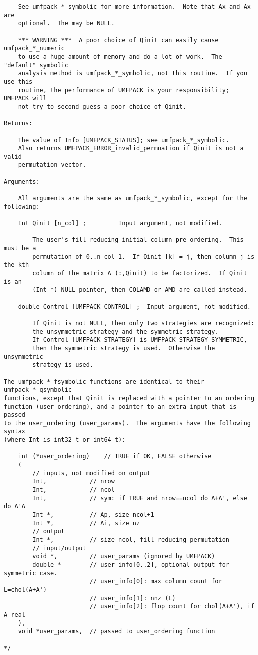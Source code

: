 \documentclass[11pt]{article}
\begin{document}
{\begin{verbatim}
    See umfpack_*_symbolic for more information.  Note that Ax and Ax are
    optional.  The may be NULL.

    *** WARNING ***  A poor choice of Qinit can easily cause umfpack_*_numeric
    to use a huge amount of memory and do a lot of work.  The "default" symbolic
    analysis method is umfpack_*_symbolic, not this routine.  If you use this
    routine, the performance of UMFPACK is your responsibility;  UMFPACK will
    not try to second-guess a poor choice of Qinit.

Returns:

    The value of Info [UMFPACK_STATUS]; see umfpack_*_symbolic.
    Also returns UMFPACK_ERROR_invalid_permuation if Qinit is not a valid
    permutation vector.

Arguments:

    All arguments are the same as umfpack_*_symbolic, except for the following:

    Int Qinit [n_col] ;         Input argument, not modified.

        The user's fill-reducing initial column pre-ordering.  This must be a
        permutation of 0..n_col-1.  If Qinit [k] = j, then column j is the kth
        column of the matrix A (:,Qinit) to be factorized.  If Qinit is an
        (Int *) NULL pointer, then COLAMD or AMD are called instead.

    double Control [UMFPACK_CONTROL] ;  Input argument, not modified.

        If Qinit is not NULL, then only two strategies are recognized:
        the unsymmetric strategy and the symmetric strategy.
        If Control [UMFPACK_STRATEGY] is UMFPACK_STRATEGY_SYMMETRIC,
        then the symmetric strategy is used.  Otherwise the unsymmetric
        strategy is used.

The umfpack_*_fsymbolic functions are identical to their umfpack_*_qsymbolic
functions, except that Qinit is replaced with a pointer to an ordering
function (user_ordering), and a pointer to an extra input that is passed
to the user_ordering (user_params).  The arguments have the following syntax
(where Int is int32_t or int64_t):

    int (*user_ordering)    // TRUE if OK, FALSE otherwise
    (
        // inputs, not modified on output
        Int,            // nrow
        Int,            // ncol
        Int,            // sym: if TRUE and nrow==ncol do A+A', else do A'A
        Int *,          // Ap, size ncol+1
        Int *,          // Ai, size nz
        // output
        Int *,          // size ncol, fill-reducing permutation
        // input/output
        void *,         // user_params (ignored by UMFPACK)
        double *        // user_info[0..2], optional output for symmetric case.
                        // user_info[0]: max column count for L=chol(A+A')
                        // user_info[1]: nnz (L)
                        // user_info[2]: flop count for chol(A+A'), if A real
    ),
    void *user_params,  // passed to user_ordering function

*/

\end{verbatim}
}
\end{document}
